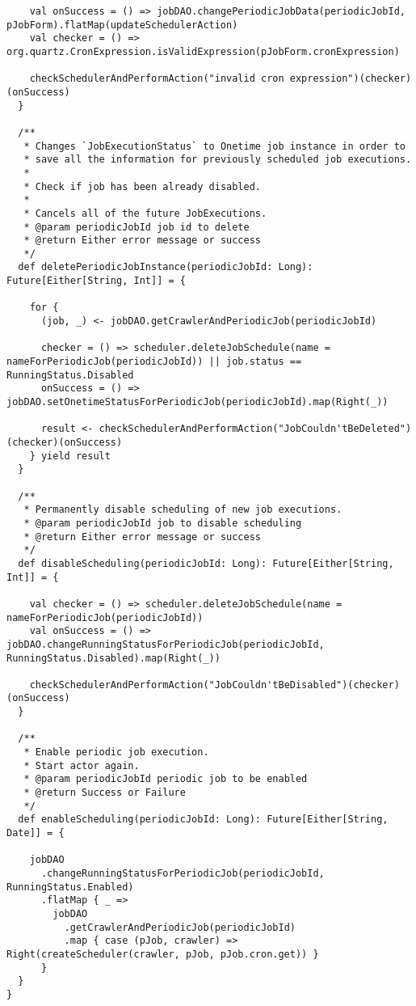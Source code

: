 \begin{lstlisting}
    val onSuccess = () => jobDAO.changePeriodicJobData(periodicJobId, pJobForm).flatMap(updateSchedulerAction)
    val checker = () => org.quartz.CronExpression.isValidExpression(pJobForm.cronExpression)

    checkSchedulerAndPerformAction("invalid cron expression")(checker)(onSuccess)
  }

  /**
   * Changes `JobExecutionStatus` to Onetime job instance in order to
   * save all the information for previously scheduled job executions.
   *
   * Check if job has been already disabled.
   *
   * Cancels all of the future JobExecutions.
   * @param periodicJobId job id to delete
   * @return Either error message or success
   */
  def deletePeriodicJobInstance(periodicJobId: Long): Future[Either[String, Int]] = {

    for {
      (job, _) <- jobDAO.getCrawlerAndPeriodicJob(periodicJobId)

      checker = () => scheduler.deleteJobSchedule(name = nameForPeriodicJob(periodicJobId)) || job.status == RunningStatus.Disabled
      onSuccess = () => jobDAO.setOnetimeStatusForPeriodicJob(periodicJobId).map(Right(_))

      result <- checkSchedulerAndPerformAction("JobCouldn'tBeDeleted")(checker)(onSuccess)
    } yield result
  }

  /**
   * Permanently disable scheduling of new job executions.
   * @param periodicJobId job to disable scheduling
   * @return Either error message or success
   */
  def disableScheduling(periodicJobId: Long): Future[Either[String, Int]] = {

    val checker = () => scheduler.deleteJobSchedule(name = nameForPeriodicJob(periodicJobId))
    val onSuccess = () => jobDAO.changeRunningStatusForPeriodicJob(periodicJobId, RunningStatus.Disabled).map(Right(_))

    checkSchedulerAndPerformAction("JobCouldn'tBeDisabled")(checker)(onSuccess)
  }

  /**
   * Enable periodic job execution.
   * Start actor again.
   * @param periodicJobId periodic job to be enabled
   * @return Success or Failure
   */
  def enableScheduling(periodicJobId: Long): Future[Either[String, Date]] = {

    jobDAO
      .changeRunningStatusForPeriodicJob(periodicJobId, RunningStatus.Enabled)
      .flatMap { _ =>
        jobDAO
          .getCrawlerAndPeriodicJob(periodicJobId)
          .map { case (pJob, crawler) => Right(createScheduler(crawler, pJob, pJob.cron.get)) }
      }
  }
}
\end{lstlisting}
